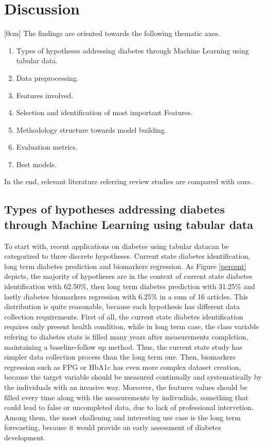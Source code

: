 \documentclass[journal,article,submit,pdftex,moreauthors]{Definitions/mdpi}
\begin{document}
			

		

\section{Discussion}
[0cm]
 The findings are oriented towards the following thematic axes.
 \begin{enumerate}
	\item Types of hypotheses addressing diabetes through Machine Learning using tabular data.
	\item Data preprocessing.
	\item Features involved.
	\item Selection and identification of most important Features.
    \item Methodology structure towards model building.
    \item Evaluation metrics. 
    \item Best models.
\end{enumerate}
In the end, relevant literature referring review studies are compared with ours. 
\subsection{Types of hypotheses addressing diabetes through Machine Learning using tabular data}
To start with,  recent applications on diabetes using tabular datacan be categorized to three discrete hypotheses. Current state 
diabetes identification, long term diabetes prediction and biomarkers regression. 
As Figure \ref{percent} depicts, the majority of hypotheses are in the context of current state diabetes identification with 
62.50\%, then long term diabetes prediction with 31.25\% and lastly diabetes biomarkers regression with 6.25\% in a sum of 16 articles. This
distribution is quite reasonable, because each hypothesis has different data collection requirements. First of all, the 
current state diabetes identification requires only present health condition, while in long term case, the class variable 
refering to diabetes state is filled many years after measurements completion, maintaining a baseline-follow up method. Thus,
the current state study has simpler data collection process than the long term one. Then, biomarkers regression such as 
FPG or HbA1c has even more complex dataset creation, because  the target variable should be measured continually and systematically
by the individuals with an invasive way. Moreover, the features values should be filled every time along with the measurements by 
indivudials, something that could lead to false or uncompleted data, due to lack of professional intervetion. Among them, the most
challening and interesting use case is the long term forecasting, because it would provide an early assessment of diabetes development.
\end{document}

